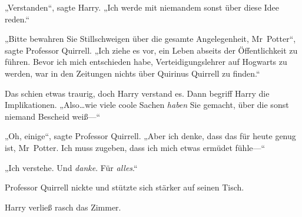 „Verstanden“, sagte Harry. „Ich werde mit niemandem sonst über diese Idee reden.“

„Bitte bewahren Sie Stillschweigen über die gesamte Angelegenheit, Mr~Potter“, sagte Professor Quirrell. „Ich ziehe es vor, ein Leben abseits der Öffentlichkeit zu führen. Bevor ich mich entschieden habe, Verteidigungslehrer auf Hogwarts zu werden, war in den Zeitungen nichts über Quirinus Quirrell zu finden.“

Das schien etwas traurig, doch Harry verstand es. Dann begriff Harry die Implikationen. „Also…wie viele coole Sachen \emph{haben} Sie gemacht, über die sonst niemand Bescheid weiß—“

„Oh, einige“, sagte Professor Quirrell. „Aber ich denke, dass das für heute genug ist, Mr~Potter. Ich muss zugeben, dass ich mich etwas ermüdet fühle—“

„Ich verstehe. Und \emph{danke}. Für \emph{alles}.“

Professor Quirrell nickte und stützte sich stärker auf seinen Tisch.

Harry verließ rasch das Zimmer.

